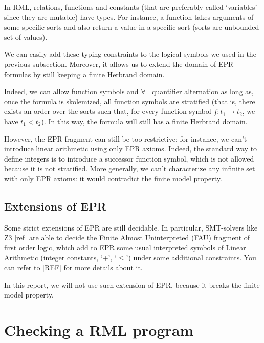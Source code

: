 \documentclass[11pt,a4paper,oldfontcommands,openany]{memoir}
\begin{document}
        In RML, relations, functions and constants (that are preferably called `variables' since they are mutable) have types.
        For instance, a function takes arguments of some specific sorts and also return a value in a specific sort (sorts are unbounded set of values).

        We can easily add these typing constraints to the logical symbols we used in the previous subsection.
        Moreover, it allows us to extend the domain of EPR formulas by still keeping a finite Herbrand domain.

        Indeed, we can allow function symbols and \(\forall\exists\) quantifier alternation as long as,
        once the formula is skolemized, all function symbols are stratified (that is, there exists
        an order over the sorts such that, for every function symbol \( f: t_1 \to t_2 \), we have \( t_1 < t_2 \)).
        In this way, the formula will still has a finite Herbrand domain.

        However, the EPR fragment can still be too restrictive: for instance, we can't introduce linear arithmetic using only EPR axioms.
        Indeed, the standard way to define integers is to introduce a successor function symbol, which is not allowed because it is not stratified.
        More generally, we can't characterize any infinite set with only EPR axioms: it would contradict the finite model property.

        \subsection{Extensions of EPR}

        Some strict extensions of EPR are still decidable.
        In particular, SMT-solvers like Z3 [ref] are able to decide the Finite Almost Uninterpreted (FAU) fragment of first order logic,
        which add to EPR some usual interpreted symbols of Linear Arithmetic (integer constants, `+', `\( \leq \)') under some additional constraints.
        You can refer to [REF] for more details about it. 
        
        In this report, we will not use such extension of EPR, because it breaks the finite model property.
    
    \section{Checking a RML program}
\end{document}
